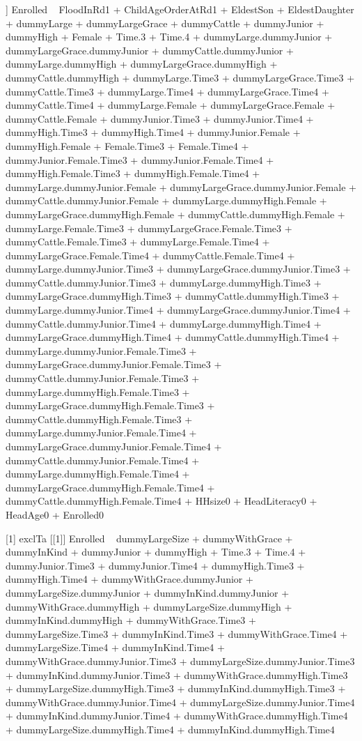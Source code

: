 \begin{Schunk}
\begin{Soutput}
[[6]]
Enrolled ~ FloodInRd1 + ChildAgeOrderAtRd1 + EldestSon + EldestDaughter + 
    dummyLarge + dummyLargeGrace + dummyCattle + dummyJunior + 
    dummyHigh + Female + Time.3 + Time.4 + dummyLarge.dummyJunior + 
    dummyLargeGrace.dummyJunior + dummyCattle.dummyJunior + dummyLarge.dummyHigh + 
    dummyLargeGrace.dummyHigh + dummyCattle.dummyHigh + dummyLarge.Time3 + 
    dummyLargeGrace.Time3 + dummyCattle.Time3 + dummyLarge.Time4 + 
    dummyLargeGrace.Time4 + dummyCattle.Time4 + dummyLarge.Female + 
    dummyLargeGrace.Female + dummyCattle.Female + dummyJunior.Time3 + 
    dummyJunior.Time4 + dummyHigh.Time3 + dummyHigh.Time4 + dummyJunior.Female + 
    dummyHigh.Female + Female.Time3 + Female.Time4 + dummyJunior.Female.Time3 + 
    dummyJunior.Female.Time4 + dummyHigh.Female.Time3 + dummyHigh.Female.Time4 + 
    dummyLarge.dummyJunior.Female + dummyLargeGrace.dummyJunior.Female + 
    dummyCattle.dummyJunior.Female + dummyLarge.dummyHigh.Female + 
    dummyLargeGrace.dummyHigh.Female + dummyCattle.dummyHigh.Female + 
    dummyLarge.Female.Time3 + dummyLargeGrace.Female.Time3 + 
    dummyCattle.Female.Time3 + dummyLarge.Female.Time4 + dummyLargeGrace.Female.Time4 + 
    dummyCattle.Female.Time4 + dummyLarge.dummyJunior.Time3 + 
    dummyLargeGrace.dummyJunior.Time3 + dummyCattle.dummyJunior.Time3 + 
    dummyLarge.dummyHigh.Time3 + dummyLargeGrace.dummyHigh.Time3 + 
    dummyCattle.dummyHigh.Time3 + dummyLarge.dummyJunior.Time4 + 
    dummyLargeGrace.dummyJunior.Time4 + dummyCattle.dummyJunior.Time4 + 
    dummyLarge.dummyHigh.Time4 + dummyLargeGrace.dummyHigh.Time4 + 
    dummyCattle.dummyHigh.Time4 + dummyLarge.dummyJunior.Female.Time3 + 
    dummyLargeGrace.dummyJunior.Female.Time3 + dummyCattle.dummyJunior.Female.Time3 + 
    dummyLarge.dummyHigh.Female.Time3 + dummyLargeGrace.dummyHigh.Female.Time3 + 
    dummyCattle.dummyHigh.Female.Time3 + dummyLarge.dummyJunior.Female.Time4 + 
    dummyLargeGrace.dummyJunior.Female.Time4 + dummyCattle.dummyJunior.Female.Time4 + 
    dummyLarge.dummyHigh.Female.Time4 + dummyLargeGrace.dummyHigh.Female.Time4 + 
    dummyCattle.dummyHigh.Female.Time4 + HHsize0 + HeadLiteracy0 + 
    HeadAge0 + Enrolled0

[1] exclTa
[[1]]
Enrolled ~ dummyLargeSize + dummyWithGrace + dummyInKind + dummyJunior + 
    dummyHigh + Time.3 + Time.4 + dummyJunior.Time3 + dummyJunior.Time4 + 
    dummyHigh.Time3 + dummyHigh.Time4 + dummyWithGrace.dummyJunior + 
    dummyLargeSize.dummyJunior + dummyInKind.dummyJunior + dummyWithGrace.dummyHigh + 
    dummyLargeSize.dummyHigh + dummyInKind.dummyHigh + dummyWithGrace.Time3 + 
    dummyLargeSize.Time3 + dummyInKind.Time3 + dummyWithGrace.Time4 + 
    dummyLargeSize.Time4 + dummyInKind.Time4 + dummyWithGrace.dummyJunior.Time3 + 
    dummyLargeSize.dummyJunior.Time3 + dummyInKind.dummyJunior.Time3 + 
    dummyWithGrace.dummyHigh.Time3 + dummyLargeSize.dummyHigh.Time3 + 
    dummyInKind.dummyHigh.Time3 + dummyWithGrace.dummyJunior.Time4 + 
    dummyLargeSize.dummyJunior.Time4 + dummyInKind.dummyJunior.Time4 + 
    dummyWithGrace.dummyHigh.Time4 + dummyLargeSize.dummyHigh.Time4 + 
    dummyInKind.dummyHigh.Time4


\end{Soutput}
\end{Schunk}
